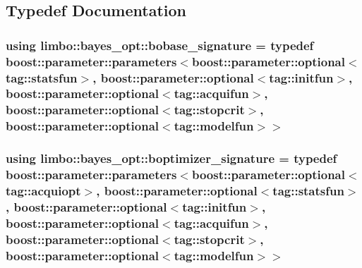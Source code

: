 \subsection{Typedef Documentation}
\subsubsection[{\texorpdfstring{bobase\+\_\+signature}{bobase_signature}}]{\setlength{\rightskip}{0pt plus 5cm}using {\bf limbo\+::bayes\+\_\+opt\+::bobase\+\_\+signature} = typedef boost\+::parameter\+::parameters$<$boost\+::parameter\+::optional$<$tag\+::statsfun$>$, boost\+::parameter\+::optional$<$tag\+::initfun$>$, boost\+::parameter\+::optional$<$tag\+::acquifun$>$, boost\+::parameter\+::optional$<$tag\+::stopcrit$>$, boost\+::parameter\+::optional$<$tag\+::modelfun$>$$>$}\hypertarget{namespacelimbo_1_1bayes__opt_a824303857a6912240f23e422927773f7}{}\label{namespacelimbo_1_1bayes__opt_a824303857a6912240f23e422927773f7}
\subsubsection[{\texorpdfstring{boptimizer\+\_\+signature}{boptimizer_signature}}]{\setlength{\rightskip}{0pt plus 5cm}using {\bf limbo\+::bayes\+\_\+opt\+::boptimizer\+\_\+signature} = typedef boost\+::parameter\+::parameters$<$boost\+::parameter\+::optional$<$tag\+::acquiopt$>$, boost\+::parameter\+::optional$<$tag\+::statsfun$>$, boost\+::parameter\+::optional$<$tag\+::initfun$>$, boost\+::parameter\+::optional$<$tag\+::acquifun$>$, boost\+::parameter\+::optional$<$tag\+::stopcrit$>$, boost\+::parameter\+::optional$<$tag\+::modelfun$>$$>$}\hypertarget{namespacelimbo_1_1bayes__opt_a6f7eddef5a0de80d03fe4df398480997}{}\label{namespacelimbo_1_1bayes__opt_a6f7eddef5a0de80d03fe4df398480997}
